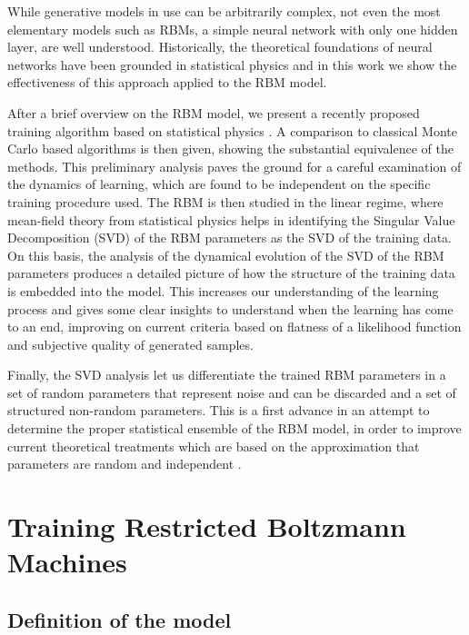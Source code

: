 \documentclass[notitlepage]{revtex4-1}
\begin{document}
While generative models in use can be arbitrarily complex, not even the most elementary models such as RBMs, a simple neural network with only one hidden layer, are well understood. Historically, the theoretical foundations of neural networks have been grounded in statistical physics \cite{hist1}\cite{hist2} and in this work we show the effectiveness of this approach applied to the RBM model.

After a brief overview on the RBM model, we present a recently proposed training algorithm based on statistical physics \cite{tap_train}\cite{tap}. A comparison to classical Monte Carlo based algorithms is then given, showing the substantial equivalence of the methods. This preliminary analysis paves the ground for a careful examination of the dynamics of learning, which are found to be independent on the specific training procedure used. The RBM is then studied in the linear regime, where mean-field theory from statistical physics helps in identifying the Singular Value Decomposition (SVD) of the RBM parameters as the SVD of the training data.
On this basis, the analysis of the dynamical evolution of the SVD of the RBM parameters produces a detailed picture of how the structure of the training data is embedded into the model. This increases our understanding of the learning process and gives some clear insights to understand when the learning has come to an end, improving on current criteria based on flatness of a likelihood function and subjective quality of generated samples.

Finally, the SVD analysis let us differentiate the trained RBM parameters in a set of random parameters that represent noise and can be discarded and a set of structured non-random parameters. This is a first advance in an attempt to determine the proper statistical ensemble of the RBM model, in order to improve current theoretical treatments which are based on the approximation that parameters are random and independent \cite{monasson}.

\section{Training Restricted Boltzmann Machines} \label{training}

\subsection{Definition of the model}
\end{document}
